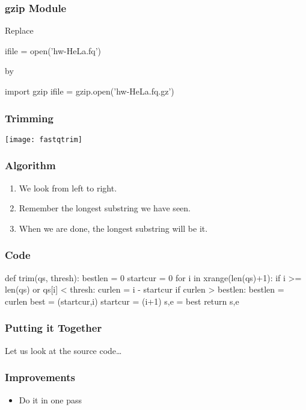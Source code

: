 \begin{frame}[fragile]
\frametitle{gzip Module}


Replace

\begin{python}
ifile = open('hw-HeLa.fq')
\end{python}

by

\begin{python}
import gzip
ifile = gzip.open('hw-HeLa.fq.gz')
\end{python}
\end{frame}


\begin{frame}[fragile]
\frametitle{Trimming}

\centering
\texttt{[image: fastqtrim]}

\end{frame}

\begin{frame}[fragile]
\frametitle{Algorithm}

\begin{enumerate}
\item We look from left to right.
\item Remember the longest substring we have seen.
\item When we are done, the longest substring will be it.
\end{enumerate}

\end{frame}

\begin{frame}[fragile]
\frametitle{Code}
\begin{python}
def trim(qs, thresh):
    bestlen = 0
    startcur = 0
    for i in xrange(len(qs)+1):
        if i >= len(qs) or qs[i] < thresh:
            curlen = i - startcur
            if curlen > bestlen:
                bestlen = curlen
                best = (startcur,i)
            startcur = (i+1)
    s,e = best
    return s,e
\end{python}
\end{frame}

\begin{frame}[fragile]
\frametitle{Putting it Together}

Let us look at the source code\ldots
\end{frame}

\begin{frame}[fragile]
\frametitle{Improvements}
\begin{itemize}
\item Do it in one pass
\end{itemize}
\end{frame}


